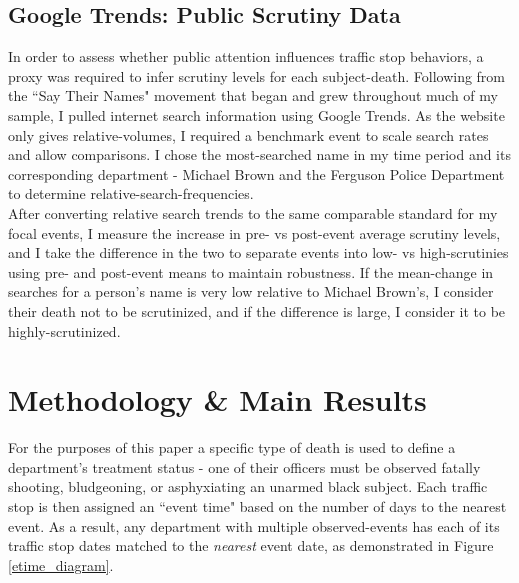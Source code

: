\documentclass[12pt,a4paper]{article}
\begin{document}
\subsection{Google Trends: Public Scrutiny Data}
In order to assess whether public attention influences traffic stop behaviors, a proxy was required to infer scrutiny levels for each subject-death. Following from the ``Say Their Names" movement that began and grew throughout much of my sample, I pulled internet search information using Google Trends. As the website only gives relative-volumes, I required a benchmark event to scale search rates and allow comparisons. I chose the most-searched name in my time period and its corresponding department - Michael Brown and the Ferguson Police Department to determine relative-search-frequencies. \\

After converting relative search trends to the same comparable standard for my focal events, I measure the increase in pre- vs post-event average scrutiny levels, and I take the difference in the two to separate events into low- vs high-scrutinies using pre- and post-event means to maintain robustness. If the mean-change in searches for a person's name is very low relative to Michael Brown's, I consider their death not to be scrutinized, and if the difference is large, I consider it to be highly-scrutinized. 

\section{Methodology \& Main Results}
For the purposes of this paper a specific type of death is used to define a department's treatment status - one of their officers must be observed fatally shooting, bludgeoning, or asphyxiating an unarmed black subject. Each traffic stop is then assigned an ``event time" based on the number of days to the nearest event. As a result, any department with multiple observed-events has each of its traffic stop dates matched to the \textit{nearest} event date, as demonstrated in Figure \ref{etime_diagram}. \\
\end{document}
